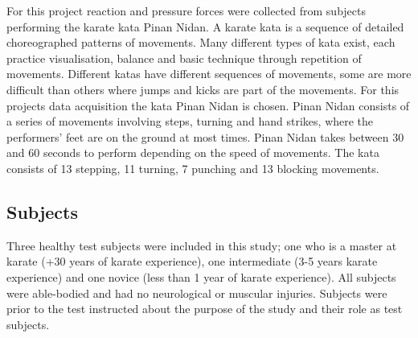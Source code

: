 

For this project reaction and pressure forces were collected from subjects performing the karate kata Pinan Nidan. %
A karate kata is a sequence of detailed choreographed patterns of movements. Many different types of kata exist, each practice visualisation, balance and basic technique through repetition of movements. Different katas have different sequences of movements, some are more difficult than others where jumps and kicks are part of the movements. For this projects data acquisition the kata Pinan Nidan is chosen. 
Pinan Nidan consists of a series of movements involving steps, turning and hand strikes, where the performers' feet are on the ground at most times. Pinan Nidan takes between 30 and 60 seconds to perform depending on the speed of movements. The kata consists of 13 stepping, 11 turning, 7 punching and 13 blocking movements. \cite{Mccarthy1987, seikenryu2017, Dojo2018}

\subsection{Subjects} %
Three healthy test subjects were included in this study; one who is a master at karate (+30 years of karate experience), one intermediate (3-5 years karate experience) and one novice (less than 1 year of karate experience). All subjects were able-bodied and had no neurological or muscular injuries. Subjects were prior to the test instructed about the purpose of the study and their role as test subjects.




